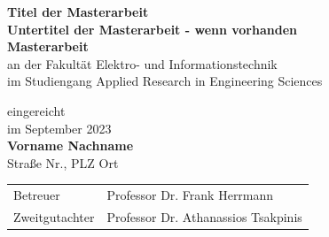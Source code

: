 \begin{center}
    \vspace*{4cm} %
    \Large
	\textbf{Titel der Masterarbeit}\\ %
    \large
    \textbf{Untertitel der Masterarbeit - wenn vorhanden}\\ %
    
    \vspace*{2cm} %
    \textbf{Masterarbeit}\\ %
    \vspace*{1cm}
    \large
        an der Fakultät Elektro- und Informationstechnik\\
        im Studiengang Applied Research in Engineering Sciences
    \\ %
    
    \vspace*{2cm} 
    \normalsize
    
    \begin{center}
        eingereicht\\
        im September 2023\\
        \textbf{Vorname Nachname}\\
        Straße Nr., PLZ Ort
        
        
    \end{center}
    
    \vspace*{2cm}      
    
    \begin{table}[H]
        \centering
        \begin{tabular}{ll}
            Betreuer & Professor Dr. Frank Herrmann \\
            Zweitgutachter & Professor Dr. Athanassios Tsakpinis \\
        \end{tabular}%
    \end{table}%
        
\end{center}
